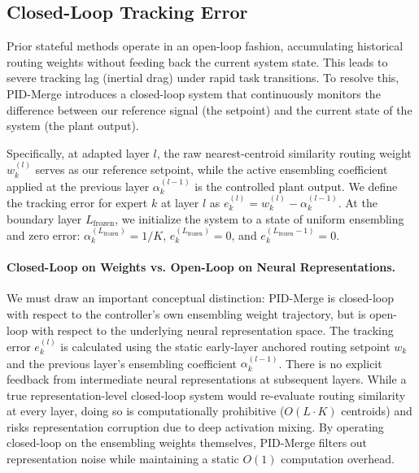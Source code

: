 \subsection{Closed-Loop Tracking Error}
Prior stateful methods operate in an open-loop fashion, accumulating historical routing weights without feeding back the current system state. This leads to severe tracking lag (inertial drag) under rapid task transitions. To resolve this, PID-Merge introduces a closed-loop system that continuously monitors the difference between our reference signal (the setpoint) and the current state of the system (the plant output).

Specifically, at adapted layer $l$, the raw nearest-centroid similarity routing weight $w_k^{(l)}$ serves as our reference setpoint, while the active ensembling coefficient applied at the previous layer $\alpha_k^{(l-1)}$ is the controlled plant output. We define the tracking error for expert $k$ at layer $l$ as $e_k^{(l)} = w_k^{(l)} - \alpha_k^{(l-1)}$. At the boundary layer $L_{\text{frozen}}$, we initialize the system to a state of uniform ensembling and zero error: $\alpha_k^{(L_{\text{frozen}})} = 1/K$, $e_k^{(L_{\text{frozen}})} = 0$, and $e_k^{(L_{\text{frozen}}-1)} = 0$.

\paragraph{Closed-Loop on Weights vs. Open-Loop on Neural Representations.}
We must draw an important conceptual distinction: PID-Merge is closed-loop with respect to the controller's own ensembling weight trajectory, but is open-loop with respect to the underlying neural representation space. The tracking error $e_k^{(l)}$ is calculated using the static early-layer anchored routing setpoint $w_k$ and the previous layer's ensembling coefficient $\alpha_k^{(l-1)}$. There is no explicit feedback from intermediate neural representations at subsequent layers. While a true representation-level closed-loop system would re-evaluate routing similarity at every layer, doing so is computationally prohibitive ($O(L \cdot K)$ centroids) and risks representation corruption due to deep activation mixing. By operating closed-loop on the ensembling weights themselves, PID-Merge filters out representation noise while maintaining a static $O(1)$ computation overhead.

